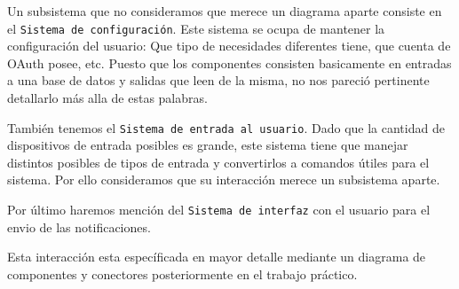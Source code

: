 Un subsistema que no consideramos que merece un diagrama aparte consiste en
el \texttt{Sistema de configuración}. Este sistema se ocupa de mantener la
configuración del usuario: Que tipo de necesidades diferentes tiene, que 
cuenta de OAuth posee, etc. Puesto que los componentes consisten basicamente
en entradas a una base de datos y salidas que leen de la misma, no nos
pareció pertinente detallarlo más alla de estas palabras.

También tenemos el \texttt{Sistema de entrada al usuario}. Dado que la 
cantidad de dispositivos de entrada posibles es grande, este sistema tiene 
que manejar distintos posibles de tipos de entrada y convertirlos a 
comandos útiles para el sistema. Por ello consideramos que su interacción 
merece un subsistema aparte.

Por último haremos mención del \texttt{Sistema de interfaz} con el usuario para el envio 
de las notificaciones. 

Esta interacción esta específicada en mayor detalle mediante un diagrama de componentes 
y conectores posteriormente en el trabajo práctico.

